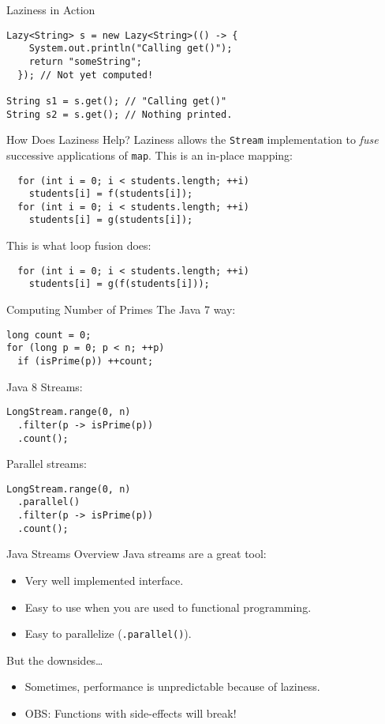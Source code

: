 \documentclass{beamer}
\begin{document}
\begin{frame}[fragile]{Laziness in Action}
\begin{lstlisting}
Lazy<String> s = new Lazy<String>(() -> {
    System.out.println("Calling get()");
    return "someString";
  }); // Not yet computed!

String s1 = s.get(); // "Calling get()"
String s2 = s.get(); // Nothing printed.
\end{lstlisting}
\end{frame}

\begin{frame}[fragile]{How Does Laziness Help?}
Laziness allows the \lstinline{Stream} implementation to \emph{fuse} successive applications of \lstinline{map}. This is an in-place mapping:

\begin{lstlisting}
  for (int i = 0; i < students.length; ++i)
    students[i] = f(students[i]);
  for (int i = 0; i < students.length; ++i)
    students[i] = g(students[i]);
\end{lstlisting}

\pause{} This is what loop fusion does:
\begin{lstlisting}
  for (int i = 0; i < students.length; ++i)
    students[i] = g(f(students[i]));
\end{lstlisting}
\end{frame}

\begin{frame}[fragile]{Computing Number of Primes}
The Java 7 way:
\begin{lstlisting}
long count = 0;
for (long p = 0; p < n; ++p)
  if (isPrime(p)) ++count;
\end{lstlisting}

\pause{} Java 8 Streams:
\begin{lstlisting}
LongStream.range(0, n)
  .filter(p -> isPrime(p))
  .count();
\end{lstlisting}

\pause{} Parallel streams:
\begin{lstlisting}
LongStream.range(0, n)
  .parallel()
  .filter(p -> isPrime(p))
  .count();
\end{lstlisting}
\end{frame}

\begin{frame}{Java Streams Overview}
  Java streams are a great tool:
  \begin{itemize}
  \item Very well implemented interface.
  \item Easy to use when you are used to functional programming.
  \item Easy to parallelize (\lstinline{.parallel()}).
  \end{itemize}

  \pause{} But the downsides\dots{}
  \begin{itemize}
  \item Sometimes, performance is unpredictable because of laziness.
  \item OBS: Functions with side-effects will break!
  \end{itemize}

\end{frame}
\end{document}
